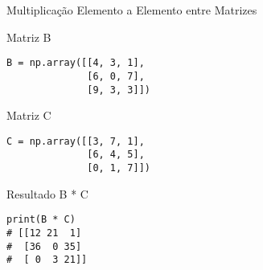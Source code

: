 \begin{frame}[fragile]{Multiplicação Elemento a Elemento entre Matrizes}


        \begin{block}{Matriz B}
\begin{verbatim}
B = np.array([[4, 3, 1],
              [6, 0, 7],
              [9, 3, 3]])
\end{verbatim}
        \end{block}
        
        \begin{block}{Matriz C}
\begin{verbatim}
C = np.array([[3, 7, 1],
              [6, 4, 5],
              [0, 1, 7]])
\end{verbatim}
        \end{block}

        \begin{exampleblock}{Resultado B * C}
\begin{verbatim}
print(B * C)
# [[12 21  1]
#  [36  0 35]
#  [ 0  3 21]]
\end{verbatim}
        \end{exampleblock}
        

\end{frame}


